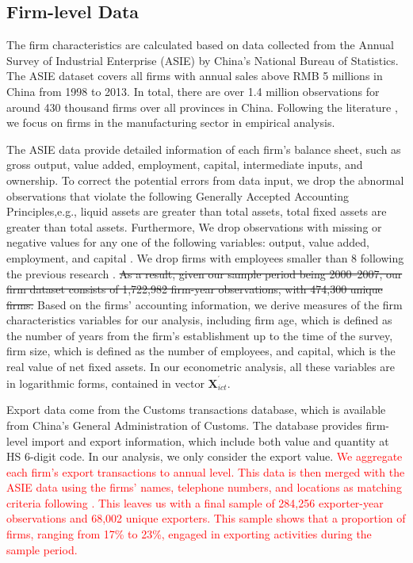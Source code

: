 \documentclass[12pt]{article}
\begin{document}
\subsection{Firm-level Data}

\label{sec:data_firm} The firm characteristics are calculated based on data
collected from the Annual Survey of Industrial Enterprise (ASIE) by China's
National Bureau of Statistics. The ASIE dataset covers all firms with annual
sales above RMB 5 millions in China from 1998 to 2013. In total, there are
over 1.4 million observations for around 430 thousand firms over all
provinces in China. Following the literature \citep[e.g.,][]{brandt2012creative, fu2021trans},
we focus on firms in the manufacturing sector in empirical analysis.

The ASIE data provide detailed information of each firm's balance sheet,
such as gross output, value added, employment, capital, intermediate inputs,
and ownership. To correct the potential errors from data input, we drop the
abnormal observations that violate the following Generally Accepted
Accounting Principles,e.g., liquid assets are greater than total assets, total
fixed assets are greater than total assets. Furthermore, We drop observations with missing or negative values for any one of
the following variables: output, value added, employment, and capital \citep{cai2009competition,yu2015processing}. We
drop firms with employees smaller than 8 following the previous research %
\citep{brandt2012creative}. \sout{As a result, given our sample period being
2000--2007, our firm dataset consists of 1,722,982 firm-year observations,
with 474,300 unique firms.} Based on the firms' accounting information, we
derive measures of the firm characteristics variables for our analysis,
including firm age, which is defined as the number of years from the firm's
establishment up to the time of the survey, firm size, which is defined as
the number of employees, and capital, which is the real value of net fixed
assets. In our econometric analysis, all these variables are in logarithmic
forms, contained in vector $\mathbf{X}_{ict}^{^{\prime }}.$

Export data come from the Customs transactions database, which is available
from China's General Administration of Customs. The database provides
firm-level import and export information, which include both value and
quantity at HS 6-digit code. In our analysis, we only consider the export value. \textcolor{red}{We aggregate each firm's export transactions to annual level. This data is then merged with the ASIE data using the firms'
names, telephone numbers, and locations as matching criteria following \citep{yu2015processing}. This leaves us with a final sample of 284,256 exporter-year observations and 68,002 unique exporters. This sample shows that a proportion of firms, ranging from 17\% to 23\%, engaged in exporting activities during the sample period.}
\end{document}
